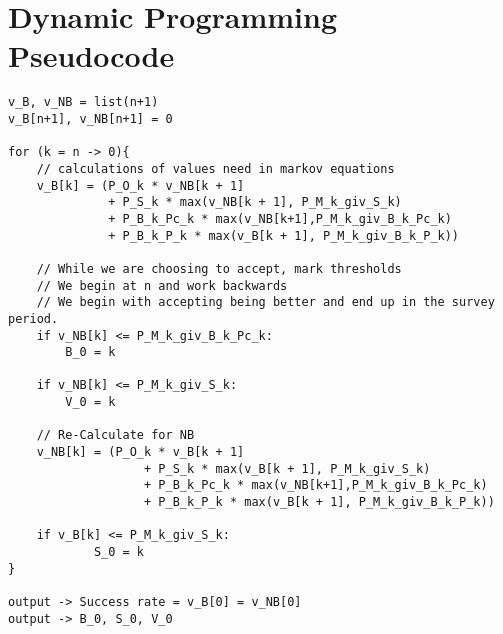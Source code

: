 \documentclass[a4paper,11pt]{article}
\begin{document}
\section{Dynamic Programming Pseudocode}
\label{sec:AppendixB}

\begin{verbatim}
v_B, v_NB = list(n+1)
v_B[n+1], v_NB[n+1] = 0

for (k = n -> 0){
    // calculations of values need in markov equations
    v_B[k] = (P_O_k * v_NB[k + 1]
              + P_S_k * max(v_NB[k + 1], P_M_k_giv_S_k)
              + P_B_k_Pc_k * max(v_NB[k+1],P_M_k_giv_B_k_Pc_k)
              + P_B_k_P_k * max(v_B[k + 1], P_M_k_giv_B_k_P_k))

    // While we are choosing to accept, mark thresholds
    // We begin at n and work backwards 
    // We begin with accepting being better and end up in the survey period.
    if v_NB[k] <= P_M_k_giv_B_k_Pc_k:
        B_0 = k

    if v_NB[k] <= P_M_k_giv_S_k:
        V_0 = k

    // Re-Calculate for NB
    v_NB[k] = (P_O_k * v_B[k + 1]
                   + P_S_k * max(v_B[k + 1], P_M_k_giv_S_k)
                   + P_B_k_Pc_k * max(v_NB[k+1],P_M_k_giv_B_k_Pc_k)
                   + P_B_k_P_k * max(v_B[k + 1], P_M_k_giv_B_k_P_k))

    if v_B[k] <= P_M_k_giv_S_k:
            S_0 = k
}

output -> Success rate = v_B[0] = v_NB[0]
output -> B_0, S_0, V_0

\end{verbatim}
\end{document}

